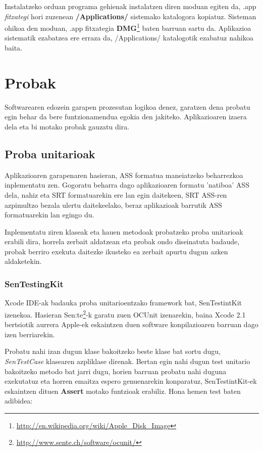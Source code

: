 Instalatzeko orduan programa gehienak instalatzen diren moduan egiten da, .app \textit{fitxategi} hori zuzenean \textbf{/Applications/} sistemako katalogora kopiatuz. Sisteman ohikoa den moduan, .app fitxategia \textbf{DMG}\footnote{\url{http://en.wikipedia.org/wiki/Apple_Disk_Image}} baten barruan sartu da. Aplikazioa sistematik ezabatzea ere erraza da, /Applications/ katalogotik ezabatuz nahikoa baita.

\section{Probak}
Softwarearen edozein garapen prozesutan logikoa denez, garatzen dena probatu egin behar da bere funtzionamendua egokia den jakiteko. Aplikazioaren izaera dela eta bi motako probak gauzatu dira.

\subsection{Proba unitarioak}
Aplikazioaren garapenaren hasieran, ASS formatua maneiatzeko beharrezkoa inplementatu zen. Gogoratu beharra dago aplikazioaren formatu 'natiboa' ASS dela, nahiz eta SRT formatuarekin ere lan egin daitekeen, SRT ASS-ren azpimultzo bezala ulertu daitekeelako, beraz aplikazioak barrutik ASS formatuarekin lan egingo du.

Inplementatu ziren klaseak eta hauen metodoak probatzeko proba unitarioak erabili dira, horrela zerbait aldatzean eta probak ondo diseinatuta badaude, probak berriro exekuta daitezke ikusteko ea zerbait apurtu dugun azken aldaketekin.

\subsubsection{SenTestingKit}
Xcode IDE-ak badauka proba unitarioentzako framework bat, SenTestintKit izenekoa. Hasieran Sen:te\footnote{\url{http://www.sente.ch/software/ocunit/}}-k garatu zuen OCUnit izenarekin, baina Xcode 2.1 bertsiotik aurrera Apple-ek eskaintzen duen software konpilazioaren barruan dago izen berriarekin.

Probatu nahi izan dugun klase bakoitzeko beste klase bat sortu dugu, \textit{SenTestCase} klasearen azpliklase direnak. Bertan egin nahi dugun test unitario bakoitzeko metodo bat jarri dugu, horien barruan probatu nahi duguna exekutatuz eta horren emaitza espero genuenarekin konparatuz, SenTestintKit-ek eskaintzen dituen \textbf{Assert} motako funtzioak erabiliz. Hona hemen test baten adibidea:

